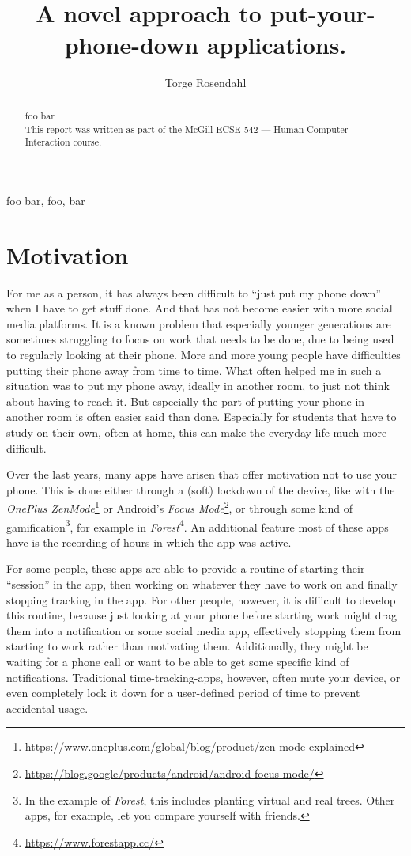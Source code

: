 \documentclass[conference]{IEEEtran}
\title{\projectname\\\Large{A novel approach to put-your-phone-down applications.}}
\author{Torge Rosendahl}
\begin{document}
\maketitle

\begin{abstract}
foo bar
\\
This report was written as part of the McGill ECSE 542 --- Human-Computer Interaction course.
\end{abstract}

\begin{IEEEkeywords}
foo bar, foo, bar
\end{IEEEkeywords}

\section{Motivation}
For me as a person, it has always been difficult to ``just put my phone down'' when I have to get stuff done. And that has not become easier with more social media platforms. It is a known problem that especially younger generations are sometimes struggling to focus on work that needs to be done, due to being used to regularly looking at their phone. More and more young people have difficulties putting their phone away from time to time. What often helped me in such a situation was to put my phone away, ideally in another room, to just not think about having to reach it. But especially the part of putting your phone in another room is often easier said than done. Especially for students that have to study on their own, often at home, this can make the everyday life much more difficult.

Over the last years, many apps have arisen that offer motivation not to use your phone. This is done either through a (soft) lockdown of the device, like with the \textit{OnePlus ZenMode}\footnote{\url{https://www.oneplus.com/global/blog/product/zen-mode-explained}} or Android's \textit{Focus Mode}\footnote{\url{https://blog.google/products/android/android-focus-mode/}}, or through some kind of gamification\footnote{In the example of \textit{Forest}, this includes planting virtual and real trees. Other apps, for example, let you compare yourself with friends.}, for example in \textit{Forest}\footnote{\url{https://www.forestapp.cc/}}. An additional feature most of these apps have is the recording of hours in which the app was active.

For some people, these apps are able to provide a routine of starting their ``session'' in the app, then working on whatever they have to work on and finally stopping tracking in the app. For other people, however, it is difficult to develop this routine, because just looking at your phone before starting work might drag them into a notification or some social media app, effectively stopping them from starting to work rather than motivating them. Additionally, they might be waiting for a phone call or want to be able to get some specific kind of notifications. Traditional time-tracking-apps, however, often mute your device, or even completely lock it down for a user-defined period of time to prevent accidental usage.
\end{document}
